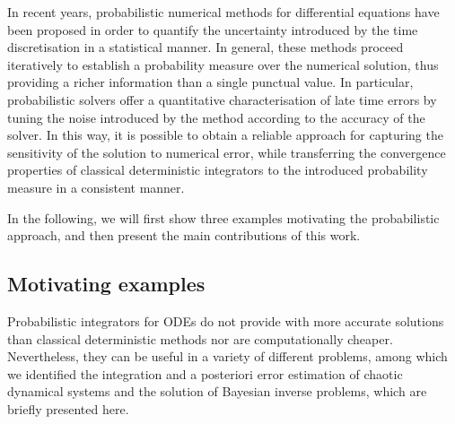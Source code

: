 \documentclass[10pt]{article}
\begin{document}
In recent years, probabilistic numerical methods for differential equations have been proposed \cite{CGS16, CCC16, KeH16} in order to quantify the uncertainty introduced by the time discretisation in a statistical manner. In general, these methods proceed iteratively to establish a probability measure over the numerical solution, thus providing a richer information than a single punctual value. In particular, probabilistic solvers offer a quantitative characterisation of late time errors by tuning the noise introduced by the method according to the accuracy of the solver. In this way, it is possible to obtain a reliable approach for capturing the sensitivity of the solution to numerical error, while transferring the convergence properties of classical deterministic integrators to the introduced probability measure in a consistent manner. 

In the following, we will first show three examples motivating the probabilistic approach, and then present the main contributions of this work.

\subsection{Motivating examples} Probabilistic integrators for ODEs do not provide with more accurate solutions than classical deterministic methods nor are computationally cheaper. Nevertheless, they can be useful in a variety of different problems, among which we identified the integration and a posteriori error estimation of chaotic dynamical systems and the solution of Bayesian inverse problems, which are briefly presented here.
\end{document}
